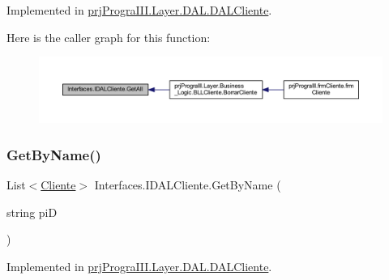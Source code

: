 Implemented in \hyperlink{classprj_progra_i_i_i_1_1_layer_1_1_d_a_l_1_1_d_a_l_cliente_a7c513194970afd18572e1b93bb8ba4d9}{prj\+Progra\+I\+I\+I.\+Layer.\+D\+A\+L.\+D\+A\+L\+Cliente}.

Here is the caller graph for this function\+:
\nopagebreak
\begin{figure}[H]
\begin{center}
\leavevmode
\includegraphics[width=350pt]{interface_interfaces_1_1_i_d_a_l_cliente_ac6adab4e78fae5e2bb08bff403d83fe7_icgraph}
\end{center}
\end{figure}
\hypertarget{interface_interfaces_1_1_i_d_a_l_cliente_a11ca3e48a2e757780fd59a2bd85e522f}{}\label{interface_interfaces_1_1_i_d_a_l_cliente_a11ca3e48a2e757780fd59a2bd85e522f} 
\subsubsection{\texorpdfstring{Get\+By\+Name()}{GetByName()}}
{\footnotesize\ttfamily List$<$\hyperlink{classprj_progra_i_i_i_1_1_layer_1_1_entities_1_1_cliente}{Cliente}$>$ Interfaces.\+I\+D\+A\+L\+Cliente.\+Get\+By\+Name (\begin{DoxyParamCaption}\item[{string}]{piD }\end{DoxyParamCaption})}



Implemented in \hyperlink{classprj_progra_i_i_i_1_1_layer_1_1_d_a_l_1_1_d_a_l_cliente_ad65a26a4c49f914716a21169e79815c8}{prj\+Progra\+I\+I\+I.\+Layer.\+D\+A\+L.\+D\+A\+L\+Cliente}.

